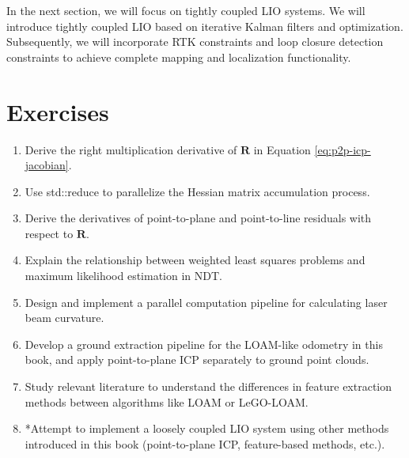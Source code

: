 In the next section, we will focus on tightly coupled LIO systems. We will introduce tightly coupled LIO based on iterative Kalman filters and optimization. Subsequently, we will incorporate RTK constraints and loop closure detection constraints to achieve complete mapping and localization functionality.

\section*{Exercises}
\begin{enumerate}
	\item Derive the right multiplication derivative of $\mathbf{R}$ in Equation \eqref{eq:p2p-icp-jacobian}.
	\item Use std::reduce to parallelize the Hessian matrix accumulation process.
	\item Derive the derivatives of point-to-plane and point-to-line residuals with respect to $\mathbf{R}$.
	\item Explain the relationship between weighted least squares problems and maximum likelihood estimation in NDT.
	\item Design and implement a parallel computation pipeline for calculating laser beam curvature.
	\item Develop a ground extraction pipeline for the LOAM-like odometry in this book, and apply point-to-plane ICP separately to ground point clouds.
	\item Study relevant literature to understand the differences in feature extraction methods between algorithms like LOAM or LeGO-LOAM.
	\item *Attempt to implement a loosely coupled LIO system using other methods introduced in this book (point-to-plane ICP, feature-based methods, etc.).
\end{enumerate}

